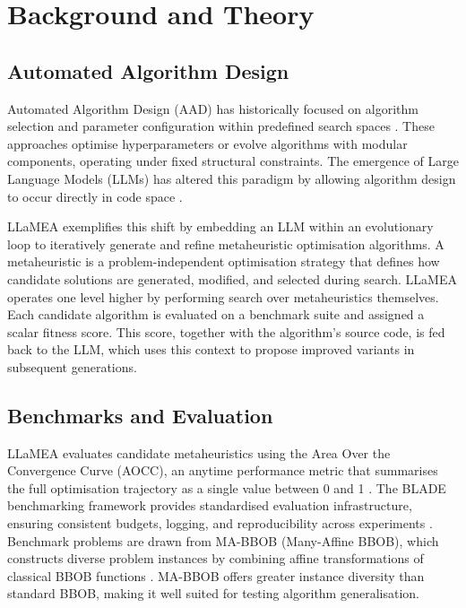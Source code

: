 \documentclass[12pt]{article}
\begin{document}


\clearpage
\setcounter{page}{1}

\section{Background and Theory}

\subsection{Automated Algorithm Design}

Automated Algorithm Design (AAD) has historically focused on algorithm selection and parameter configuration within predefined search spaces \cite{rice1976algorithmselection, hutter2009paramils}. These approaches optimise hyperparameters or evolve algorithms with modular components, operating under fixed structural constraints. The emergence of Large Language Models (LLMs) has altered this paradigm by allowing algorithm design to occur directly in code space \cite{romeraparedes2024funsearch, liu2024eoh}.

LLaMEA \cite{vanStein2024LLaMEA} exemplifies this shift by embedding an LLM within an evolutionary loop to iteratively generate and refine metaheuristic optimisation algorithms. A metaheuristic is a problem-independent optimisation strategy that defines how candidate solutions are generated, modified, and selected during search. LLaMEA operates one level higher by performing search over metaheuristics themselves. Each candidate algorithm is evaluated on a benchmark suite and assigned a scalar fitness score. This score, together with the algorithm's source code, is fed back to the LLM, which uses this context to propose improved variants in subsequent generations.

\subsection{Benchmarks and Evaluation}

LLaMEA evaluates candidate metaheuristics using the Area Over the Convergence Curve (AOCC), an anytime performance metric that summarises the full optimisation trajectory as a single value between 0 and 1 \cite{vanStein2025BLADE}. The BLADE benchmarking framework provides standardised evaluation infrastructure, ensuring consistent budgets, logging, and reproducibility across experiments \cite{vanStein2025BLADE}. Benchmark problems are drawn from MA-BBOB (Many-Affine BBOB), which constructs diverse problem instances by combining affine transformations of classical BBOB functions \cite{vermetten2023mabbob, hansen2021coco}. MA-BBOB offers greater instance diversity than standard BBOB, making it well suited for testing algorithm generalisation.
\end{document}
